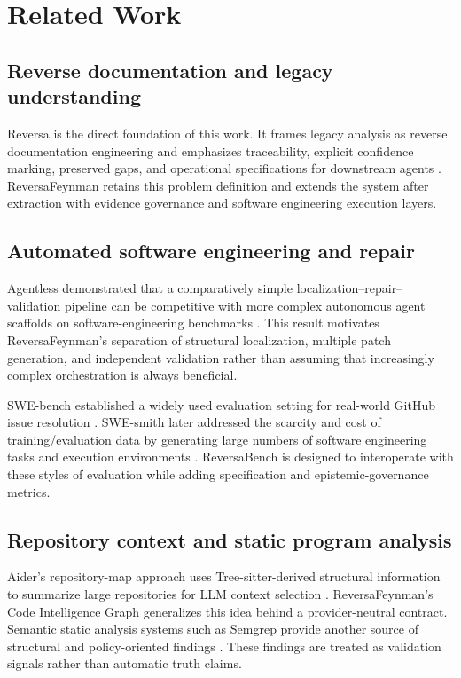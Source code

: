 \section{Related Work}

\subsection{Reverse documentation and legacy understanding}

Reversa is the direct foundation of this work. It frames legacy analysis as reverse documentation engineering and emphasizes traceability, explicit confidence marking, preserved gaps, and operational specifications for downstream agents \cite{macedo2026reversa}. ReversaFeynman retains this problem definition and extends the system after extraction with evidence governance and software engineering execution layers.

\subsection{Automated software engineering and repair}

Agentless demonstrated that a comparatively simple localization--repair--validation pipeline can be competitive with more complex autonomous agent scaffolds on software-engineering benchmarks \cite{xia2024agentless}. This result motivates ReversaFeynman's separation of structural localization, multiple patch generation, and independent validation rather than assuming that increasingly complex orchestration is always beneficial.

SWE-bench established a widely used evaluation setting for real-world GitHub issue resolution \cite{jimenez2024swebench}. SWE-smith later addressed the scarcity and cost of training/evaluation data by generating large numbers of software engineering tasks and execution environments \cite{yang2025swesmith}. ReversaBench is designed to interoperate with these styles of evaluation while adding specification and epistemic-governance metrics.

\subsection{Repository context and static program analysis}

Aider's repository-map approach uses Tree-sitter-derived structural information to summarize large repositories for LLM context selection \cite{aider2026repomap}. ReversaFeynman's Code Intelligence Graph generalizes this idea behind a provider-neutral contract. Semantic static analysis systems such as Semgrep provide another source of structural and policy-oriented findings \cite{semgrep2026}. These findings are treated as validation signals rather than automatic truth claims.

